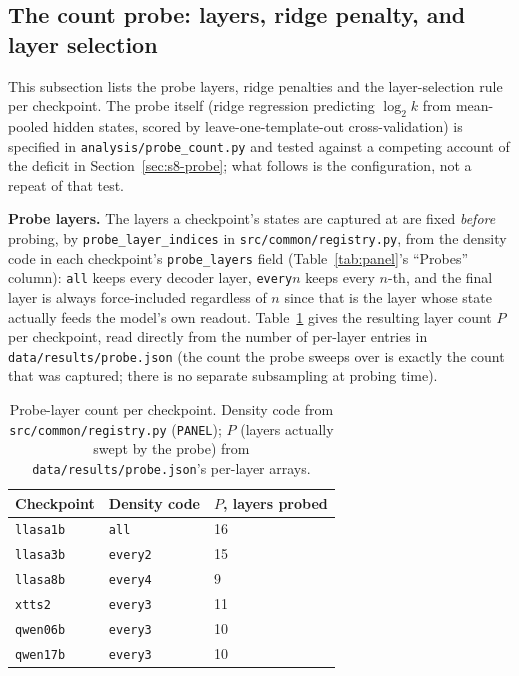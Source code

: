 \documentclass[11pt]{article}
\begin{document}
\subsection{The count probe: layers, ridge penalty, and layer selection}
\label{sec:s6-probe}

This subsection lists the probe layers, ridge penalties and the
layer-selection rule per checkpoint. The probe itself (ridge regression
predicting $\log_2 k$ from mean-pooled hidden states, scored by
leave-one-template-out cross-validation) is specified in
\texttt{analysis/probe\_count.py} and
tested against a competing account of the deficit in
Section~\ref{sec:s8-probe}; what follows is the configuration, not a repeat of
that test.

\noindent\textbf{Probe layers.} The layers a checkpoint's states are captured
at are fixed \emph{before} probing, by \texttt{probe\_layer\_indices} in
\texttt{src/common/registry.py}, from the density code in each checkpoint's
\texttt{probe\_layers} field (Table~\ref{tab:panel}'s ``Probes'' column):
\texttt{all} keeps every decoder layer, \texttt{every}$n$ keeps every $n$-th,
and the final layer is always force-included regardless of $n$ since that is
the layer whose state actually feeds the model's own readout. Table~\ref{tab:probe-layers}
gives the resulting layer count $P$ per checkpoint, read directly from the
number of per-layer entries in \texttt{data/results/probe.json} (the count the
probe sweeps over is exactly the count that was captured; there is no separate
subsampling at probing time).

\begin{table}[h]
\centering
\caption{Probe-layer count per checkpoint. Density code from
\texttt{src/common/registry.py} (\texttt{PANEL}); $P$ (layers actually swept
by the probe) from \texttt{data/results/probe.json}'s per-layer arrays.}
\label{tab:probe-layers}
\small
\begin{tabular}{@{}lll@{}}
\toprule
Checkpoint & Density code & $P$, layers probed \\
\midrule
\texttt{llasa1b} & \texttt{all} & 16 \\
\texttt{llasa3b} & \texttt{every2} & 15 \\
\texttt{llasa8b} & \texttt{every4} & 9 \\
\texttt{xtts2} & \texttt{every3} & 11 \\
\texttt{qwen06b} & \texttt{every3} & 10 \\
\texttt{qwen17b} & \texttt{every3} & 10 \\
\bottomrule
\end{tabular}
\end{table}
\end{document}
